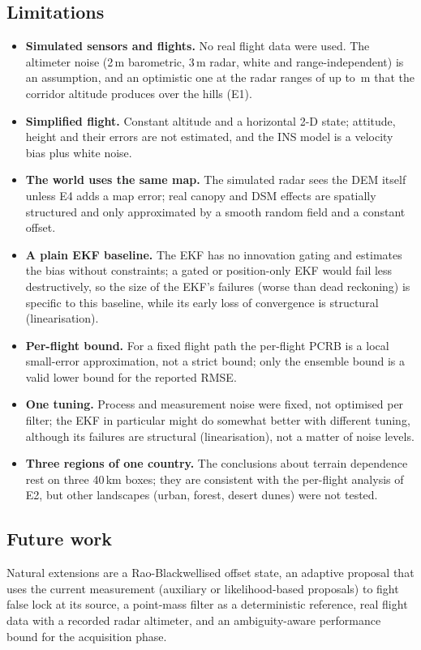 \subsection{Limitations}\label{sec:limitations}
\begin{itemize}
  \item \textbf{Simulated sensors and flights.} No real flight data were used. The altimeter noise
        (2\,m barometric, 3\,m radar, white and range-independent) is an assumption, and an
        optimistic one at the radar ranges of up to \EOneRadarHillMax\,m that the corridor altitude produces over the
        hills (E1).
  \item \textbf{Simplified flight.} Constant altitude and a horizontal 2-D state; attitude, height
        and their errors are not estimated, and the INS model is a velocity bias plus white noise.
  \item \textbf{The world uses the same map.} The simulated radar sees the DEM itself unless E4
        adds a map error; real canopy and DSM effects are spatially structured and only
        approximated by a smooth random field and a constant offset.
  \item \textbf{A plain EKF baseline.} The EKF has no innovation gating and estimates the bias
        without constraints; a gated or position-only EKF would fail less destructively, so the
        size of the EKF's failures (worse than dead reckoning) is specific to this baseline, while
        its early loss of convergence is structural (linearisation).
  \item \textbf{Per-flight bound.} For a fixed flight path the per-flight PCRB is a local
        small-error approximation, not a strict bound; only the ensemble bound is a valid lower
        bound for the reported RMSE.
  \item \textbf{One tuning.} Process and measurement noise were fixed, not optimised per filter;
        the EKF in particular might do somewhat better with different tuning, although its failures
        are structural (linearisation), not a matter of noise levels.
  \item \textbf{Three regions of one country.} The conclusions about terrain dependence rest on
        three 40\,km boxes; they are consistent with the per-flight analysis of E2, but other
        landscapes (urban, forest, desert dunes) were not tested.
\end{itemize}

\subsection{Future work}
Natural extensions are a Rao-Blackwellised offset state, an adaptive proposal that uses the
current measurement (auxiliary or likelihood-based proposals) to fight false lock at its source,
a point-mass filter as a deterministic reference, real flight data with a recorded radar
altimeter, and an ambiguity-aware performance bound for the acquisition phase.
